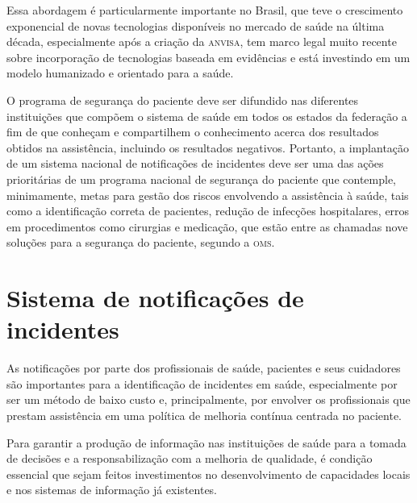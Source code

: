\documentclass{article}
\begin{document}

Essa abordagem é particularmente importante no Brasil, que teve o crescimento exponencial
        de novas tecnologias disponíveis no mercado de saúde na última década, especialmente após a
        criação da \textsc{anvisa}, tem marco legal muito recente sobre incorporação de tecnologias baseada
        em evidências %
 e está investindo em um modelo humanizado e orientado para a saúde. %


O programa de segurança do paciente deve ser difundido nas diferentes instituições que
        compõem o sistema de saúde em todos os estados da federação a fim de que conheçam e
        compartilhem o conhecimento acerca dos resultados obtidos na assistência, incluindo os
        resultados negativos. Portanto, a implantação de um sistema nacional de notificações de
        incidentes deve ser uma das ações prioritárias de um programa nacional de segurança do
        paciente que contemple, minimamente, metas para gestão dos riscos envolvendo a assistência à
        saúde, tais como a identificação correta de pacientes, redução de infecções hospitalares,
        erros em procedimentos como cirurgias e medicação, que estão entre as chamadas nove soluções
        para a segurança do paciente, segundo a \textsc{oms}. %

\section{%
Sistema de notificações de incidentes}

As notificações por parte dos profissionais de saúde, pacientes e seus cuidadores são
        importantes para a identificação de incidentes em saúde, especialmente por ser um método de
        baixo custo e, principalmente, por envolver os profissionais que prestam assistência em uma
        política de melhoria contínua centrada no paciente.

Para garantir a produção de informação nas instituições de saúde para a tomada de decisões
        e a responsabilização com a melhoria de qualidade, é condição essencial que sejam feitos
        investimentos no desenvolvimento de capacidades locais e nos sistemas de informação já
        existentes. %
\end{document}
